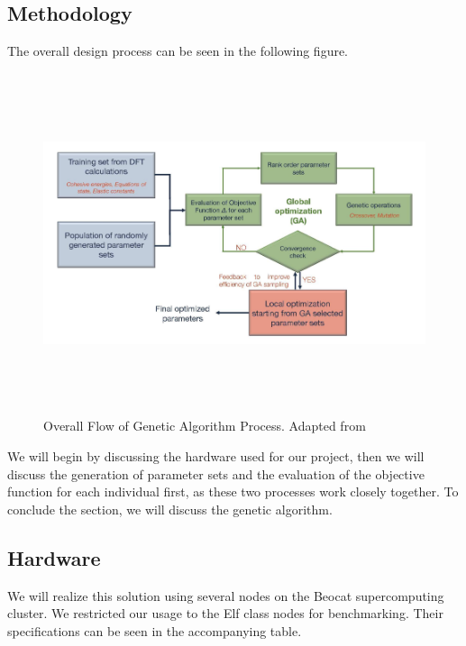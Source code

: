 \documentclass[letterpaper, 12pt]{article}
\begin{document}
\begin{flushleft}
\newpage
\section*{Methodology}
 The overall design process can be seen in the following figure.

 \begin{figure}[H]
 	\includegraphics[width=\linewidth,height=10cm,keepaspectratio]{flowchart.png}
 	\caption[Overall Flow of Genetic Algorithm Process]{Overall Flow of Genetic Algorithm Process. Adapted from \cite{Narayanan}}
 	\label{fig:arch}
 \end{figure}

We will begin by discussing the hardware used for our project, then we will discuss the generation of parameter sets and the evaluation of the objective function for each individual first, as these
two processes work closely together. To conclude the section, we will discuss the genetic algorithm.

\subsection*{Hardware}

We will realize this solution using several nodes on the Beocat supercomputing cluster.  We restricted our usage to the Elf class nodes for benchmarking. Their specifications can be seen in the accompanying table.
~\newline


\end{flushleft}
\end{document}
